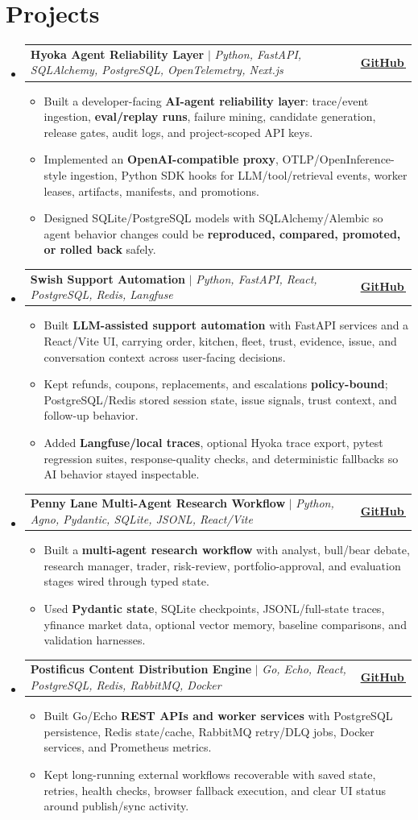\documentclass[letterpaper,11pt]{article}
\makeatletter
\newcommand{\bodyhref}[2]{\href{#1}{\underline{#2}\,\faExternalLink*}}
\newcommand{\resumeItem}[1]{\item{\fontsize{8.85pt}{9.25pt}\selectfont #1\vspace{-0.5pt}}}
\newcommand{\resumeProjectHeading}[2]{
    \item
    \begin{tabular*}{1.0\textwidth}{l@{\extracolsep{\fill}}r}
      \small#1 & \textbf{\small #2}\\
    \end{tabular*}\vspace{-4pt}
}
\newcommand{\resumeSubHeadingListStart}{\begin{itemize}[leftmargin=0.0in, label={}, itemsep=0.6pt, topsep=0pt, parsep=0pt, partopsep=0pt]}
\newcommand{\resumeSubHeadingListEnd}{\end{itemize}}
\newcommand{\resumeItemListStart}{\begin{itemize}[leftmargin=0.16in,itemsep=0.35pt,topsep=0.55pt,parsep=0pt,partopsep=0pt]}
\newcommand{\resumeItemListEnd}{\end{itemize}\vspace{-3pt}}
\makeatother
\begin{document}
\section{Projects}
\resumeSubHeadingListStart
\resumeProjectHeading
{\textbf{Hyoka Agent Reliability Layer} $|$ \emph{Python, FastAPI, SQLAlchemy, PostgreSQL, OpenTelemetry, Next.js}}{\bodyhref{https://github.com/unichronic/hyoka}{GitHub}}
\resumeItemListStart
\resumeItem{Built a developer-facing \textbf{AI-agent reliability layer}: trace/event ingestion, \textbf{eval/replay runs}, failure mining, candidate generation, release gates, audit logs, and project-scoped API keys.}
\resumeItem{Implemented an \textbf{OpenAI-compatible proxy}, OTLP/OpenInference-style ingestion, Python SDK hooks for LLM/tool/retrieval events, worker leases, artifacts, manifests, and promotions.}
\resumeItem{Designed SQLite/PostgreSQL models with SQLAlchemy/Alembic so agent behavior changes could be \textbf{reproduced, compared, promoted, or rolled back} safely.}
\resumeItemListEnd
\resumeProjectHeading
{\textbf{Swish Support Automation} $|$ \emph{Python, FastAPI, React, PostgreSQL, Redis, Langfuse}}{\bodyhref{https://github.com/unichronic/swishagent}{GitHub}}
\resumeItemListStart
\resumeItem{Built \textbf{LLM-assisted support automation} with FastAPI services and a React/Vite UI, carrying order, kitchen, fleet, trust, evidence, issue, and conversation context across user-facing decisions.}
\resumeItem{Kept refunds, coupons, replacements, and escalations \textbf{policy-bound}; PostgreSQL/Redis stored session state, issue signals, trust context, and follow-up behavior.}
\resumeItem{Added \textbf{Langfuse/local traces}, optional Hyoka trace export, pytest regression suites, response-quality checks, and deterministic fallbacks so AI behavior stayed inspectable.}
\resumeItemListEnd
\resumeProjectHeading
{\textbf{Penny Lane Multi-Agent Research Workflow} $|$ \emph{Python, Agno, Pydantic, SQLite, JSONL, React/Vite}}{\bodyhref{https://github.com/unichronic/pennylane}{GitHub}}
\resumeItemListStart
\resumeItem{Built a \textbf{multi-agent research workflow} with analyst, bull/bear debate, research manager, trader, risk-review, portfolio-approval, and evaluation stages wired through typed state.}
\resumeItem{Used \textbf{Pydantic state}, SQLite checkpoints, JSONL/full-state traces, yfinance market data, optional vector memory, baseline comparisons, and validation harnesses.}
\resumeItemListEnd
\resumeProjectHeading
{\textbf{Postificus Content Distribution Engine} $|$ \emph{Go, Echo, React, PostgreSQL, Redis, RabbitMQ, Docker}}{\bodyhref{https://github.com/unichronic/postificus}{GitHub}}
\resumeItemListStart
\resumeItem{Built Go/Echo \textbf{REST APIs and worker services} with PostgreSQL persistence, Redis state/cache, RabbitMQ retry/DLQ jobs, Docker services, and Prometheus metrics.}
\resumeItem{Kept long-running external workflows recoverable with saved state, retries, health checks, browser fallback execution, and clear UI status around publish/sync activity.}
\resumeItemListEnd
\resumeSubHeadingListEnd
\end{document}
